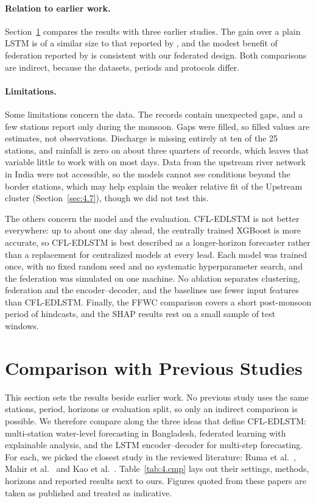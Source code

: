 \paragraph{Relation to earlier work.}
Section~\ref{sec:4.13} compares the results with three earlier studies. The gain
over a plain LSTM is of a similar size to that reported by \cite{Ruma2023}, and
the modest benefit of federation reported by \cite{Mahir2025} is consistent with
our federated design. Both comparisons are indirect, because the datasets,
periods and protocols differ.

\paragraph{Limitations.}
Some limitations concern the data. The records contain unexpected gaps, and a few
stations report only during the monsoon. Gaps were filled, so filled values are
estimates, not observations. Discharge is missing entirely at ten of the 25
stations, and rainfall is zero on about three quarters of records, which leaves
that variable little to work with on most days. Data from the upstream river
network in India were not accessible, so the models cannot see conditions beyond
the border stations, which may help explain the weaker relative fit of the
Upstream cluster (Section~\ref{sec:4.7}), though we did not test this.

The others concern the model and the evaluation. CFL-EDLSTM is not better
everywhere: up to about one day ahead, the centrally trained XGBoost is more
accurate, so CFL-EDLSTM is best described as a longer-horizon forecaster rather
than a replacement for centralized models at every lead. Each model was trained
once, with no fixed random seed and no systematic hyperparameter search, and the
federation was simulated on one machine. No ablation separates clustering,
federation and the encoder--decoder, and the baselines use fewer input features
than CFL-EDLSTM. Finally, the FFWC comparison covers a short post-monsoon period
of hindcasts, and the SHAP results rest on a small sample of test windows.

\section{Comparison with Previous Studies}
\label{sec:4.13}

This section sets the results beside earlier work. No previous study uses the
same stations, period, horizons or evaluation split, so only an indirect
comparison is possible. We therefore compare along the three ideas that define
CFL-EDLSTM: multi-station water-level forecasting in Bangladesh, federated
learning with explainable analysis, and the LSTM encoder--decoder for multi-step
forecasting. For each, we picked the closest study in the reviewed literature:
Ruma et al.~\cite{Ruma2023}, Mahir et al.~\cite{Mahir2025} and Kao et
al.~\cite{Kao2020}. Table~\ref{tab:4.cmp} lays out their settings, methods,
horizons and reported results next to ours. Figures quoted from these papers are
taken as published and treated as indicative.

